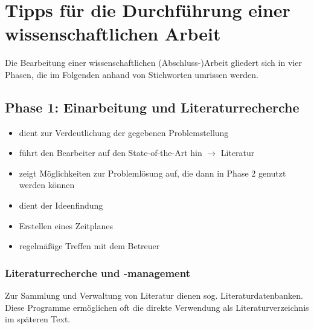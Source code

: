 \chapter{Tipps für die Durchführung einer wissenschaftlichen Arbeit}
\label{cha:Hinweise}

Die Bearbeitung einer wissenschaftlichen (Abschluss-)Arbeit gliedert sich in vier Phasen, die im Folgenden anhand von Stichworten umrissen werden.

\section{Phase 1: Einarbeitung und Literaturrecherche}
\label{sec:Einarbeitung}

\begin{itemize}
  \item dient zur Verdeutlichung der gegebenen Problemstellung
  \item führt den Bearbeiter auf den \glqq{}State-of-the-Art\grqq{} hin $\rightarrow$ Literatur
  \item zeigt Möglichkeiten zur Problemlösung auf, die dann in Phase 2 genutzt werden können
  \item dient der Ideenfindung
  \item Erstellen eines Zeitplanes
  \item regelmäßige Treffen mit dem Betreuer
\end{itemize}



\subsection*{Literaturrecherche und -management}
\label{sec:Literaturrecherche}
Zur Sammlung und Verwaltung von Literatur dienen sog. Literaturdatenbanken.
Diese Programme ermöglichen oft die direkte Verwendung als Literaturverzeichnis im späteren Text.

